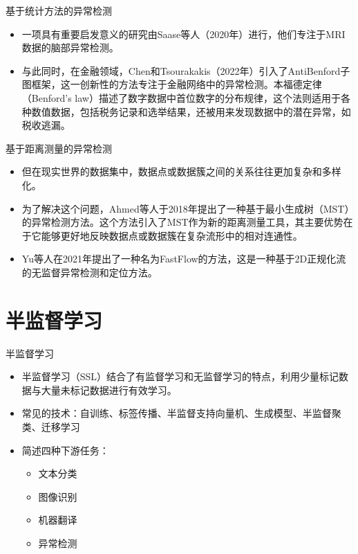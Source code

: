 \documentclass[UTF8]{beamer}
\begin{document}
\begin{frame}{基于统计方法的异常检测}
    \begin{itemize}
        \item 一项具有重要启发意义的研究由Saase等人（2020年）进行，他们专注于MRI数据的脑部异常检测。
        \item 与此同时，在金融领域，Chen和Tsourakakis（2022年）引入了AntiBenford子图框架，这一创新性的方法专注于金融网络中的异常检测。本福德定律（Benford's law）描述了数字数据中首位数字的分布规律，这个法则适用于各种数值数据，包括税务记录和选举结果，还被用来发现数据中的潜在异常，如税收逃漏。
    \end{itemize}
\end{frame}

\begin{frame}{基于距离测量的异常检测}
    \begin{itemize}
        \item 但在现实世界的数据集中，数据点或数据簇之间的关系往往更加复杂和多样化。
        \item 为了解决这个问题，Ahmed等人于2018年提出了一种基于最小生成树（MST）的异常检测方法。这个方法引入了MST作为新的距离测量工具，其主要优势在于它能够更好地反映数据点或数据簇在复杂流形中的相对连通性。
        \item Yu等人在2021年提出了一种名为FastFlow的方法，这是一种基于2D正规化流的无监督异常检测和定位方法。
    \end{itemize}
\end{frame}

\section{半监督学习}

\begin{frame}{半监督学习}
    \begin{itemize}
        \item 半监督学习（SSL）结合了有监督学习和无监督学习的特点，利用少量标记数据与大量未标记数据进行有效学习。
        \item 常见的技术：自训练、标签传播、半监督支持向量机、生成模型、半监督聚类、迁移学习
        \item 简述四种下游任务：
        \begin{itemize}
            \item 文本分类
            \item 图像识别
            \item 机器翻译
            \item 异常检测
        \end{itemize}
    \end{itemize}
\end{frame}
\end{document}
